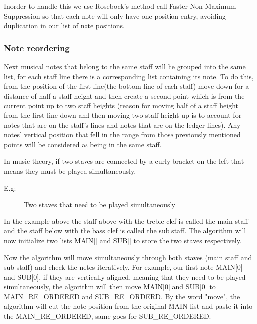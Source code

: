 \documentclass[final]{cvpr}
\begin{document}
Inorder to handle this we use Rosebock's method \cite{Rosebrock} call Faster Non
Maximum Suppression so that each note will only have one position entry, avoiding
duplication in our list of note positions.

\subsubsection{Note reordering} 

Next musical notes that belong to the same staff
will be grouped into the same list,  for each staff line there is a
corresponding list containing its note.  To do this, from the position of the
first line(the bottom line of each staff) move down for a distance of half a
staff height and then create a second point which is from the current point up
to two staff heights (reason for moving half of a staff height from
the first line down and then moving two staff height up  is to account for notes
that are on the staff's lines and notes that are on the ledger lines). Any notes'
vertical position that fell in the range from those previously mentioned points
will be considered as being in the same staff. 


In music theory, if two staves are connected by a curly bracket on the left
that means they must be played simultaneously.

E.g: 
\begin{figure}[h]
\caption{Two staves that need to be played simultaneously}
\label{fig:two staves}
\end{figure}


In the example above the staff above with the treble clef is called the main
staff and the staff below with the bass clef is called the sub staff. The
algorithm will now initialize two lists MAIN[] and SUB[] to store the two staves
respectively.

Now the algorithm will move simultaneously through both staves (main staff and sub staff) and check the
notes iteratively. For example, our first note MAIN[0] and SUB[0], if they
are vertically aligned, meaning that they need to be played simultaneously,
the algorithm will then move MAIN[0] and SUB[0] to MAIN\_RE\_ORDERED and
SUB\_RE\_ORDERD. By the word "move", the algorithm will cut the note
position from the original MAIN list and paste it into the
MAIN\_RE\_ORDERED, same goes for SUB\_RE\_ORDERED.\\
\end{document}
